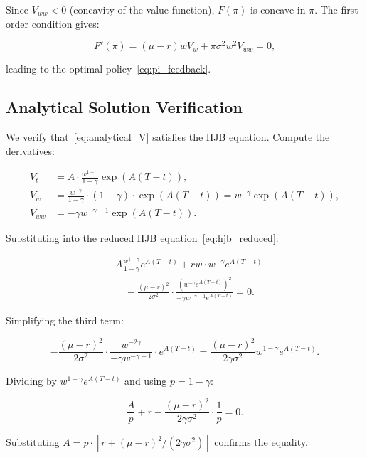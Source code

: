 \documentclass[12pt,a4paper]{article}
\begin{document}
\begin{appendices}
Since $V_{ww} < 0$ (concavity of the value function), $F(\pi)$ is concave in $\pi$. The first-order condition gives:

\begin{equation}
\label{eq:foc_detail}
F'(\pi) = (\mu - r) w V_w + \pi \sigma^2 w^2 V_{ww} = 0,
\end{equation}

leading to the optimal policy~\eqref{eq:pi_feedback}.

\subsection{Analytical Solution Verification}

We verify that~\eqref{eq:analytical_V} satisfies the HJB equation. Compute the derivatives:

\begin{align}
V_t &= A \cdot \frac{w^{1-\gamma}}{1-\gamma} \exp(A(T-t)), \\
V_w &= \frac{w^{-\gamma}}{1-\gamma} \cdot (1-\gamma) \cdot \exp(A(T-t)) = w^{-\gamma} \exp(A(T-t)), \\
V_{ww} &= -\gamma w^{-\gamma-1} \exp(A(T-t)).
\end{align}

Substituting into the reduced HJB equation~\eqref{eq:hjb_reduced}:

\begin{align}
&A \frac{w^{1-\gamma}}{1-\gamma} e^{A(T-t)} + r w \cdot w^{-\gamma} e^{A(T-t)} \\
&\quad - \frac{(\mu-r)^2}{2\sigma^2} \cdot \frac{(w^{-\gamma} e^{A(T-t)})^2}{-\gamma w^{-\gamma-1} e^{A(T-t)}} = 0.
\end{align}

Simplifying the third term:

\begin{equation}
- \frac{(\mu-r)^2}{2\sigma^2} \cdot \frac{w^{-2\gamma}}{-\gamma w^{-\gamma-1}} \cdot e^{A(T-t)} = \frac{(\mu-r)^2}{2\gamma\sigma^2} w^{1-\gamma} e^{A(T-t)}.
\end{equation}

Dividing by $w^{1-\gamma} e^{A(T-t)}$ and using $p = 1 - \gamma$:

\begin{equation}
\frac{A}{p} + r - \frac{(\mu-r)^2}{2\gamma\sigma^2} \cdot \frac{1}{p} = 0.
\end{equation}

Substituting $A = p \cdot [r + (\mu-r)^2/(2\gamma\sigma^2)]$ confirms the equality.


\end{appendices}
\end{document}
